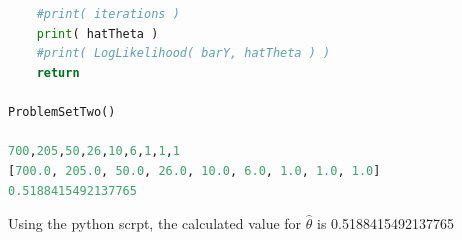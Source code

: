 \documentclass{paper}
\begin{document}
\begin{lstlisting}[language=python]
		

	#print( iterations )
	print( hatTheta )
	#print( LogLikelihood( barY, hatTheta ) )
	return

ProblemSetTwo()

700,205,50,26,10,6,1,1,1
[700.0, 205.0, 50.0, 26.0, 10.0, 6.0, 1.0, 1.0, 1.0]
0.5188415492137765

\end{lstlisting}

Using the python scrpt, the calculated value for $\hat{\theta}$ is 0.5188415492137765
\end{document}
